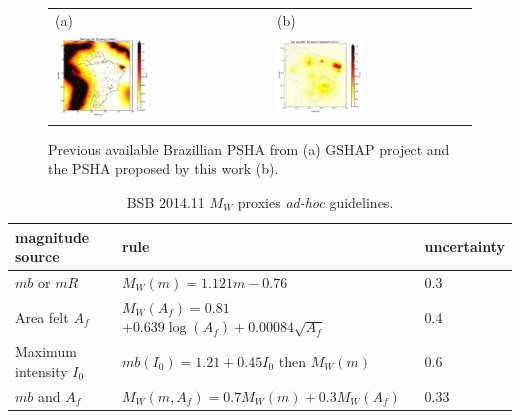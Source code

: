 \documentclass[draft, grl]{agutex}
\begin{document}
\begin{figure}
	\begin{center}
	\begin{table}[H]
		\begin{tabular}{ p{} p{} }
		\footnotesize(a)
		&
		\footnotesize(b)
		\\
		\includegraphics[width=0.45\textwidth]{z_img_pga_gshap} &
		\includegraphics[width=0.45\textwidth]{z_img_pga_helmstetter}
		\end{tabular}
	\end{table}
	\caption{Previous available Brazillian PSHA from (a) GSHAP project and the PSHA proposed by this work (b). }
	\label{placeholder}
	\end{center}
\end{figure}



\begin{table}[H]
	\caption{BSB 2014.11 $M_W$ proxies \emph{ad-hoc} guidelines.}
	\begin{tabular}{l l l}
		\hline
		\textbf{magnitude source} & \textbf{rule} & \textbf{uncertainty}\\
		\hline
		$mb$ or $mR$
		&$ M_W(m) = 1.121 m - 0.76 $
		& 0.3 \\
		Area felt $A_f$
		&$ M_W(A_f) = 0.81 $$    + 0.639\log(A_f) + 0.00084\sqrt{A_f}$& 0.4 \\
		Maximum intensity $I_0$
		& $mb(I_0) = 1.21 + 0.45 I_0$ then $M_W(m)$
		& 0.6 \\
		$mb$ and $A_f$
		& $M_W(m, A_f) = 0.7 M_W(m) + 0.3 M_W(A_f)$
		& 0.33 \\
		\hline
	\end{tabular}
	\label{tab:guidelines}
\end{table}
\end{document}
